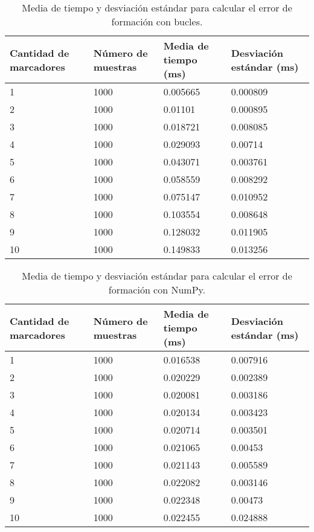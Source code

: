\begin{table}[H]
	\centering
	\resizebox{\textwidth}{!} {
	\begin{tabular}{|l|l|l|l|}
		\hline
		\textbf{Cantidad de marcadores} & \textbf{Número de muestras} & \textbf{Media de tiempo (ms)} & \textbf{Desviación estándar (ms)} \\ \hline
		1 & 1000 & 0.005665 & 0.000809 \\ \hline
		2 & 1000 & 0.01101 & 0.000895 \\ \hline
		3 & 1000 & 0.018721 & 0.008085 \\ \hline
		4 & 1000 & 0.029093 & 0.00714 \\ \hline
		5 & 1000 & 0.043071 & 0.003761 \\ \hline
		6 & 1000 & 0.058559 & 0.008292 \\ \hline
		7 & 1000 & 0.075147 & 0.010952 \\ \hline
		8 & 1000 & 0.103554 & 0.008648 \\ \hline
		9 & 1000 & 0.128032 & 0.011905 \\ \hline
		10 & 1000 & 0.149833 & 0.013256 \\ \hline
	\end{tabular}}
	\caption{Media de tiempo y desviación estándar para calcular el error de formación con bucles.}
	\label{cuadro:tiempos_error_for}
\end{table}

\begin{table}[H]
	\centering
	\resizebox{\textwidth}{!} {
	\begin{tabular}{|l|l|l|l|}
		\hline
		\textbf{Cantidad de marcadores} & \textbf{Número de muestras} & \textbf{Media de tiempo (ms)} & \textbf{Desviación estándar (ms)} \\ \hline
		1 & 1000 & 0.016538 & 0.007916 \\ \hline
		2 & 1000 & 0.020229 & 0.002389 \\ \hline
		3 & 1000 & 0.020081 & 0.003186 \\ \hline
		4 & 1000 & 0.020134 & 0.003423 \\ \hline
		5 & 1000 & 0.020714 & 0.003501 \\ \hline
		6 & 1000 & 0.021065 & 0.00453 \\ \hline
		7 & 1000 & 0.021143 & 0.005589 \\ \hline
		8 & 1000 & 0.022082 & 0.003146 \\ \hline
		9 & 1000 & 0.022348 & 0.00473 \\ \hline
		10 & 1000 & 0.022455 & 0.024888 \\ \hline
	\end{tabular}}
	\caption{Media de tiempo y desviación estándar para calcular el error de formación con NumPy.}
	\label{cuadro:tiempos_error_numpy}
\end{table}

